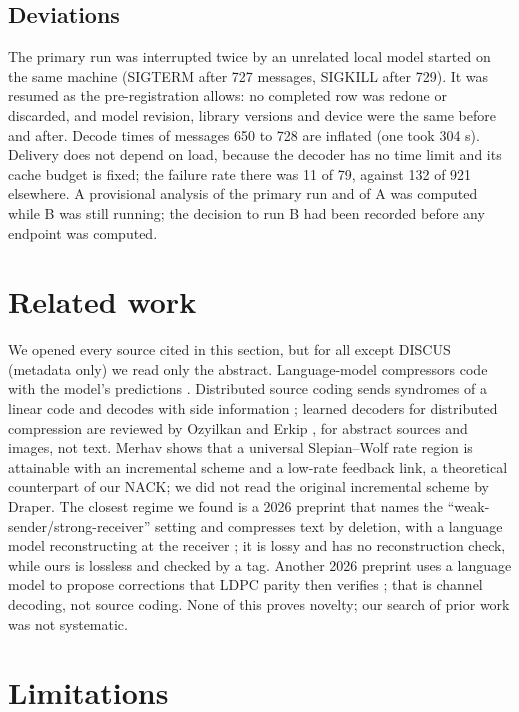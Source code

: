 \documentclass[11pt]{article}
\begin{document}
\subsection{Deviations}

The primary run was interrupted twice by an unrelated local model started on the same machine
(SIGTERM after 727 messages, SIGKILL after 729). It was resumed as the pre-registration allows: no
completed row was redone or discarded, and model revision, library versions and device were the same
before and after. Decode times of messages 650 to 728 are inflated (one took 304 s). Delivery does not
depend on load, because the decoder has no time limit and its cache budget is fixed; the failure rate
there was 11 of 79, against 132 of 921 elsewhere. A provisional analysis of the primary run and of A
was computed while B was still running; the decision to run B had been recorded before any endpoint
was computed.

\section{Related work}

We opened every source cited in this section, but for all except DISCUS (metadata only) we read
only the abstract. Language-model compressors code with the model's predictions
\cite{valmeekam2023llmzip,deletang2024}. Distributed source coding sends syndromes of a linear code
and decodes with side information \cite{pradhan2003discus}; learned decoders for distributed
compression are reviewed by Ozyilkan and Erkip \cite{ozyilkan2024}, for abstract sources and images,
not text. Merhav \cite{merhav2024} shows that a universal Slepian--Wolf rate region is attainable with
an incremental scheme and a low-rate feedback link, a theoretical counterpart of our NACK; we did not
read the original incremental scheme by Draper. The closest regime we found is a 2026 preprint that
names the ``weak-sender/strong-receiver'' setting and compresses text by deletion, with a language
model reconstructing at the receiver \cite{zou2026}; it is lossy and has no reconstruction check,
while ours is lossless and checked by a tag. Another 2026 preprint uses a language model to propose
corrections that LDPC parity then verifies \cite{park2026}; that is channel decoding, not source
coding. None of this proves novelty; our search of prior work was not systematic.

\section{Limitations}
\end{document}
